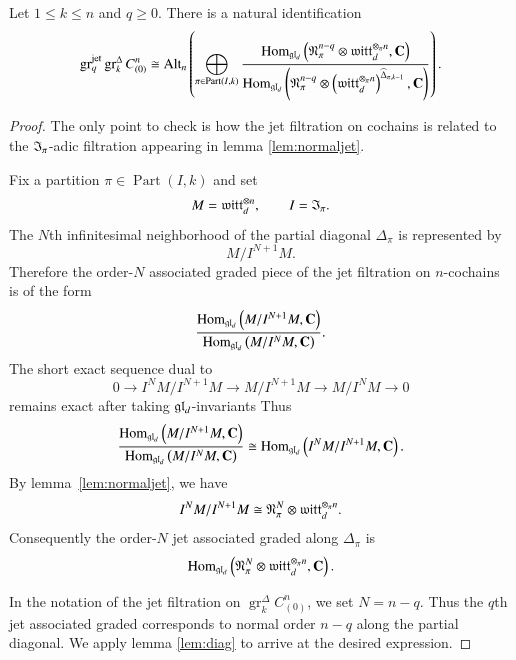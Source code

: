 \documentclass[main.tex]{subfiles}
\begin{document}
\begin{lemma}\label{lem:grgr}
Let $1\leq k\leq n$ and $q\geq 0$. 
There is a natural identification
\[
  \operatorname{gr}^{\operatorname{jet}}_q
  \operatorname{gr}^{\Delta}_k C^n_{(0)}
  \cong
  \operatorname{Alt}_n
  \left(
  \bigoplus_{\pi\in \operatorname{Part}(I,k)}
  \frac{
  \operatorname{Hom}_{\mathfrak{gl}_d}
  \left(
  \mathfrak{N}^{n-q}_\pi
  \otimes
  \mathfrak{witt}_d^{\otimes_\pi n},
  \mathbf{C}
  \right)}
  {
  \operatorname{Hom}_{\mathfrak{gl}_d}
  \left(
  \mathfrak{N}^{n-q}_\pi
  \otimes
  \left(
  \mathfrak{witt}_d^{\otimes_\pi n}
  \right)^{\widehat\Delta_{\pi,k-1}},
  \mathbf{C}
  \right)}
  \right).
\]
\end{lemma}
\begin{proof}
The only point to check is how the jet filtration on cochains is related to the $\mathfrak I_\pi$-adic filtration appearing in
lemma \ref{lem:normaljet}.

Fix a partition $\pi\in \operatorname{Part}(I,k)$ and set
\[
  M=\mathfrak{witt}_d^{\otimes n},
  \qquad
  I=\mathfrak I_\pi .
\]
The $N$th infinitesimal neighborhood of the partial diagonal $\Delta_\pi$ is represented by
\[
  M/I^{N+1}M .
\]
Therefore the order-$N$ associated graded piece of the jet filtration on $n$-cochains is of the form 
\[
  \frac{
  \operatorname{Hom}_{\mathfrak{gl}_d}
  \left(
  M/I^{N+1}M,\mathbf{C}
  \right)}
  {
  \operatorname{Hom}_{\mathfrak{gl}_d}
  \left(
  M/I^NM,\mathbf{C}
  \right)}.
\]
The short exact sequence dual to
\[
  0
  \to
  I^NM/I^{N+1}M
  \to
  M/I^{N+1}M
  \to
  M/I^NM
  \to
  0
\]
remains exact after taking $\mathfrak{gl}_d$-invariants 
Thus
\[
  \frac{
  \operatorname{Hom}_{\mathfrak{gl}_d}
  \left(
  M/I^{N+1}M,\mathbf{C}
  \right)}
  {
  \operatorname{Hom}_{\mathfrak{gl}_d}
  \left(
  M/I^NM,\mathbf{C}
  \right)}
  \cong
  \operatorname{Hom}_{\mathfrak{gl}_d}
  \left(
  I^NM/I^{N+1}M,\mathbf{C}
  \right).
\]
By lemma~\ref{lem:normaljet}, we have
\[
  I^NM/I^{N+1}M
  \cong
  \mathfrak{N}_\pi^N\otimes \mathfrak{witt}_d^{\otimes_\pi n}.
\]
Consequently the order-$N$ jet associated graded along $\Delta_\pi$ is
\[
  \operatorname{Hom}_{\mathfrak{gl}_d}
  \left(
  \mathfrak{N}_\pi^N\otimes \mathfrak{witt}_d^{\otimes_\pi n},
  \mathbf{C}
  \right).
\]

In the notation of the jet filtration on
$\operatorname{gr}^\Delta_k C^n_{(0)}$, we set $N=n-q$. Thus the $q$th jet associated graded corresponds to normal order $n-q$ along the partial diagonal.
We apply lemma \ref{lem:diag} to arrive at the desired expression.
\end{proof}
\end{document}
